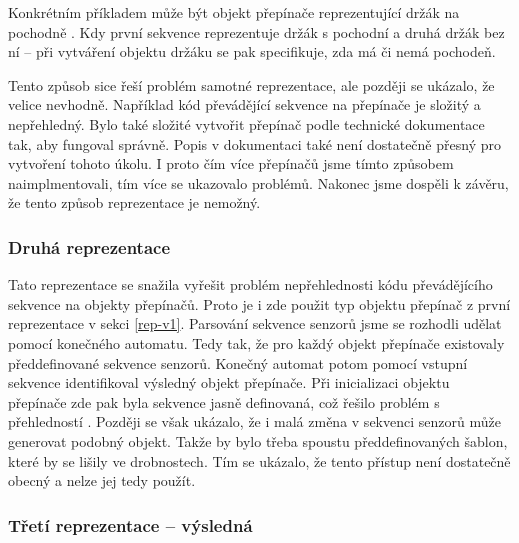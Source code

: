 

Konkrétním příkladem může být objekt přepínače reprezentující držák na pochodně .
Kdy první sekvence reprezentuje držák s pochodní a druhá držák bez ní -- při vytváření objektu držáku se pak specifikuje, zda má či nemá pochodeň. 


Tento způsob sice řeší problém samotné reprezentace, ale později se ukázalo, že velice nevhodně. Například
kód převádějící sekvence na přepínače je složitý a nepřehledný. Bylo také složité vytvořit přepínač podle technické dokumentace \cite{TechnicalDocumentationFontanel05}
tak, aby fungoval správně. Popis v dokumentaci \cite{TechnicalDocumentationFontanel05} také není dostatečně přesný pro vytvoření tohoto úkolu.
I proto čím více přepínačů jsme tímto způsobem naimplmentovali, tím více se ukazovalo problémů. Nakonec jsme dospěli k závěru, že tento způsob reprezentace je nemožný.

\subsubsection{Druhá reprezentace}

Tato reprezentace se snažila vyřešit problém nepřehlednosti kódu převádějícího sekvence na objekty přepínačů.
Proto je i zde použit typ objektu přepínač z první reprezentace v sekci \ref{rep-v1}. Parsování sekvence senzorů jsme se rozhodli udělat pomocí konečného 
automatu. Tedy tak, že pro každý objekt přepínače existovaly předdefinované sekvence senzorů. Konečný automat potom pomocí vstupní sekvence
identifikoval výsledný objekt přepínače. Při inicializaci objektu přepínače zde pak byla sekvence jasně definovaná, což řešilo problém s přehledností .
Později se však ukázalo, že i malá změna v sekvenci senzorů může generovat podobný objekt. Takže by bylo třeba
spoustu předdefinovaných šablon, které by se lišily ve drobnostech. Tím se ukázalo, že tento přístup není dostatečně obecný a nelze jej tedy použít. 

\subsubsection{Třetí reprezentace -- výsledná}

